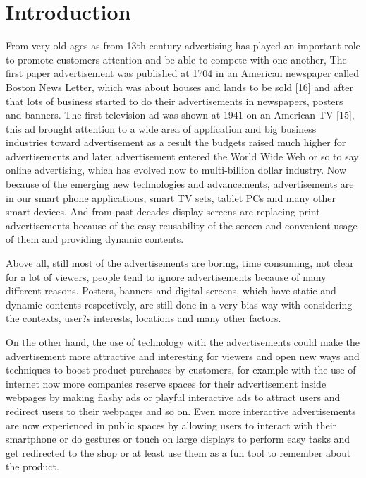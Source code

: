 
\chapter{Introduction} %

\label{Chapter1} %


\newcommand{\keyword}[1]{\textbf{#1}}
\newcommand{\tabhead}[1]{\textbf{#1}}
\newcommand{\code}[1]{\texttt{#1}}
\newcommand{\file}[1]{\texttt{\bfseries#1}}
\newcommand{\option}[1]{\texttt{\itshape#1}}


From very old ages as from 13th century advertising has played an important role to promote customers attention and be able to compete with one another, The first paper advertisement was published at 1704 in an American newspaper called Boston News Letter, which was about houses and lands to be sold [16] and after that lots of business started to do their advertisements in newspapers, posters and banners. The first television ad was shown at 1941 on an American TV [15], this ad brought attention to a wide area of application and big business industries toward advertisement as a result the budgets raised much higher for advertisements and later advertisement entered the World Wide Web or so to say online advertising, which has evolved now to multi-billion dollar industry. Now because of the emerging new technologies and advancements, advertisements are in our smart phone applications, smart TV sets, tablet PCs and many other smart devices. And from past decades display screens are replacing print advertisements because of the easy reusability of the screen and convenient usage of them and providing dynamic contents.

Above all, still most of the advertisements are boring, time consuming, not clear for a lot of viewers, people tend to ignore advertisements because of many different reasons. Posters, banners and digital screens, which have static and dynamic contents respectively, are still done in a very bias way with considering the contexts, user?s interests, locations and many other factors. 

On the other hand, the use of technology with the advertisements could make the advertisement more attractive and interesting for viewers and open new ways and techniques to boost product purchases by customers, for example with the use of internet now more companies reserve spaces for their advertisement inside webpages by making flashy ads or playful interactive ads to attract users and redirect users to their webpages and so on. Even more interactive advertisements are now experienced in public spaces by allowing users to interact with their smartphone or do gestures or touch on large displays to perform easy tasks and get redirected to the shop or at least use them as a fun tool to remember about the product.

